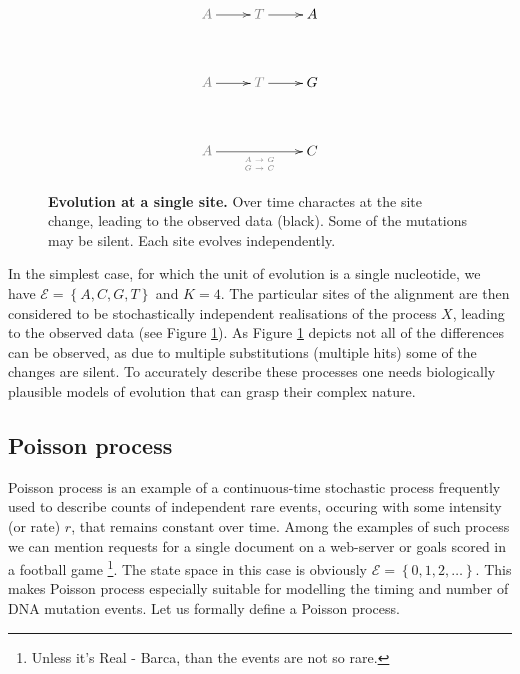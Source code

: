 \documentclass[12pt,twoside]{mitthesis}
\theoremstyle{plain}
\theoremstyle{definition}
\theoremstyle{remark}
\begin{document}
\begin{figure}[H]
\begin{center}
\begingroup
\everymath{\displaystyle}
{\Large
\begin{displaymath} %
    \xymatrix@R+1pc{ 
\color{gray2}A \ar[r] & \color{gray2}T \ar[r] & A \\
\color{gray2}A \ar[r] & \color{gray2}T \ar[r] & G \\
\color{gray2}A  \ar[rr]_{\tiny \color{gray2}\begin{array}{c}
A\rightarrow G\\
G\rightarrow C
\end{array}} &&  C
    } %
\end{displaymath}
}%
\endgroup
\end{center}
\caption{{ \footnotesize {\bf Evolution at a single site.} Over time charactes at the site change, leading to the observed data (black). Some of the mutations may be silent. Each site evolves independently.
}}
\label{fig:alignment}
\end{figure}

In the simplest case, for which the unit of evolution is a single nucleotide, we have $\mathcal{E}=\left\{ A,C,G,T\right\}$ and $K=4$.
The particular sites of the alignment are then considered to be stochastically independent realisations of the process $X$, leading to the observed data (see Figure \ref{fig:alignment}). 
As Figure \ref{fig:alignment} depicts not all of the differences can be observed, as due to multiple substitutions (multiple hits) some of the changes are silent.
To accurately describe these processes one needs biologically plausible models of evolution that can grasp their complex nature. 

\subsection{Poisson process\label{sub:poisson}}

Poisson process is an example of a continuous-time stochastic process frequently used to describe counts of independent rare events, occuring with some intensity (or rate) $r$, that remains constant over time. 
Among the examples of such process we can mention requests for a single document on a web-server or goals scored in a football game \footnote{Unless it's Real - Barca, than the events are not so rare.}.
The state space in this case is obviously $\mathcal{E} = \left\{ 0,1,2, \dots \right\}$.
This makes Poisson process especially suitable for modelling the timing and number of DNA mutation events. 
Let us formally define a Poisson process.
\end{document}
